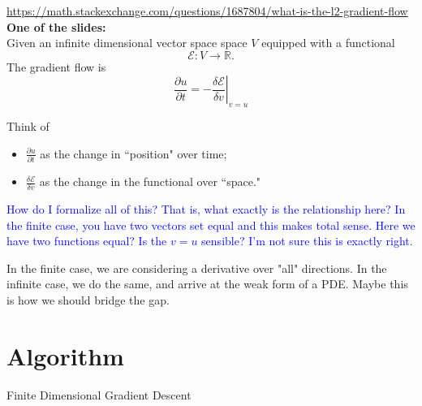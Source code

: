 \documentclass[12pt]{report} %
\makeatletter
\def\BState{\State\hskip-\ALG@thistlm}
\newcommand{\R}{\mathbb{R}}
\theoremstyle{definition}
\makeatother
\begin{document}
\url{https://math.stackexchange.com/questions/1687804/what-is-the-l2-gradient-flow}\\

\noindent\textbf{One of the slides:}\\
            Given an infinite dimensional vector space space $V$ equipped with a functional
            \[
            \mathcal{E}\colon V \to \R.
            \]
            The gradient flow is
            \[
            \frac{\partial u}{\partial t}=\left.-\frac{\delta \mathcal{E}}{\delta v}\right|_{v=u}
            \]
            
            Think of
            \begin{itemize}
                \item $\frac{\partial u}{\partial t}$ as the change in ``position" over time;
                \item $\frac{\delta \mathcal{E}}{\delta v}$ as the change in the functional over ``space."
            \end{itemize}
        
\textcolor{blue}{How do I formalize all of this? That is, what exactly is the relationship here? In the finite case, you have two vectors set equal and this makes total sense.  Here we have two functions equal?  Is the $v=u$ sensible? I'm not sure this is exactly right.}

In the finite case, we are considering a derivative over "all" directions.  In the infinite case, we do the same, and arrive at the weak form of a PDE.  Maybe this is how we should bridge the gap.

\section{Algorithm}
            \begin{algorithm}
            \caption{Finite Dimensional Gradient Descent}\label{euclid}
        \end{algorithm}
        
\end{document}
